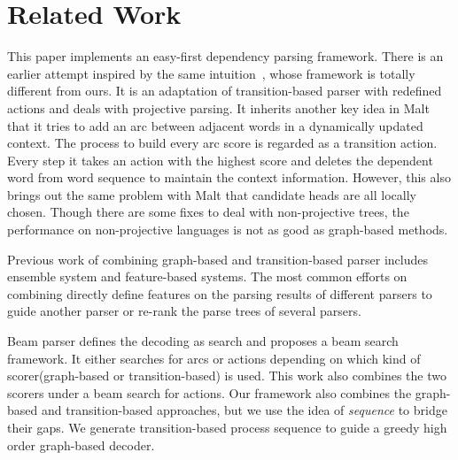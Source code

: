 \section{Related Work}
This paper implements an easy-first dependency parsing framework.
There is an earlier attempt inspired by
the same intuition~\cite{goldberg2010efficient},
whose framework is totally different from ours.
It is an adaptation of transition-based
parser with redefined actions and deals with projective parsing.
It inherits another key idea in Malt that it tries to add an arc between adjacent words in a dynamically updated context.
The process to build every arc score is regarded as
a transition action. Every step it
takes an action with the highest score and deletes the dependent word
from word sequence to maintain the context information.
However, this also brings out the same problem with Malt that
candidate heads are all locally chosen. Though there are some fixes to deal with non-projective trees,
the performance on non-projective languages is not as good as graph-based methods.

Previous work of combining graph-based and transition-based parser includes
ensemble system \cite{Sagae:2006:PCR:1614049.1614082}
and feature-based\cite{nivre2008integrating} systems.
The most common efforts on combining directly define features on
the parsing results of different
parsers to guide another parser or re-rank the parse trees of several parsers.

Beam parser \cite{zhang2008tale} defines the decoding as search and
proposes a beam search framework.
It either searches for arcs or actions depending on which kind of
scorer(graph-based or transition-based) is used.
This work also combines the two scorers under a beam search for actions.
Our framework also combines the graph-based and transition-based
approaches, but we use the idea of \textit{sequence} to bridge
their gaps.
We generate transition-based process sequence to guide a greedy
high order graph-based decoder.

